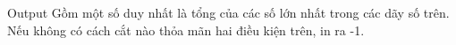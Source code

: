 Output
Gồm một số duy nhất là tổng của các số lớn nhất trong các dãy số trên. Nếu không có cách cắt nào thỏa mãn hai điều kiện trên, in ra -1.